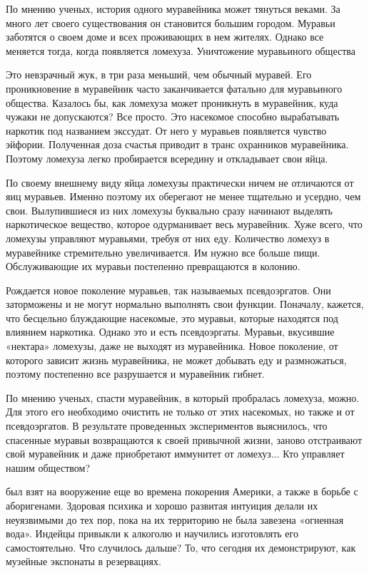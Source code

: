 \begin{itemize}
\begin{multicols}{2}
По мнению ученых, история одного муравейника может тянуться веками. За много
лет своего существования он становится большим городом. Муравьи заботятся о
своем доме и всех проживающих в нем жителях. Однако все меняется тогда, когда
появляется ломехуза.  Уничтожение муравьиного общества


Это невзрачный жук, в три раза меньший, чем обычный муравей. Его проникновение
в муравейник часто заканчивается фатально для муравьиного общества. Казалось
бы, как ломехуза может проникнуть в муравейник, куда чужаки не допускаются? Все
просто. Это насекомое способно вырабатывать наркотик под названием экссудат. От
него у муравьев появляется чувство эйфории. Полученная доза счастья приводит в
транс охранников муравейника. Поэтому ломехуза легко пробирается всередину и
откладывает свои яйца.


По своему внешнему виду яйца ломехузы практически ничем не отличаются от яиц
муравьев. Именно поэтому их оберегают не менее тщательно и усердно, чем свои.
Вылупившиеся из них ломехузы буквально сразу начинают выделять наркотическое
вещество, которое одурманивает весь муравейник. Хуже всего, что ломехузы
управляют муравьями, требуя от них еду. Количество ломехуз в муравейнике
стремительно увеличивается. Им нужно все больше пищи. Обслуживающие их муравьи
постепенно превращаются в колонию.


Рождается новое поколение муравьев, так называемых псевдоэргатов. Они
заторможены и не могут нормально выполнять свои функции. Поначалу, кажется, что
бесцельно блуждающие насекомые, это муравьи, которые находятся под влиянием
наркотика. Однако это и есть псевдоэргаты. Муравьи, вкусившие «нектара»
ломехузы, даже не выходят из муравейника. Новое поколение, от которого зависит
жизнь муравейника, не может добывать еду и размножаться, поэтому постепенно все
разрушается и муравейник гибнет.

По мнению ученых, спасти муравейник, в который пробралась ломехуза, можно. Для
этого его необходимо очистить не только от этих насекомых, но также и от
псевдоэргатов. В результате проведенных экспериментов выяснилось, что спасенные
муравьи возвращаются к своей привычной жизни, заново отстраивают свой
муравейник и даже приобретают иммунитет от ломехуз... Кто управляет нашим
обществом?

 был взят на вооружение еще во времена покорения Америки, а
также в борьбе с аборигенами. Здоровая психика и хорошо развитая интуиция
делали их неуязвимыми до тех пор, пока на их территорию не была завезена
«огненная вода». Индейцы привыкли к алкоголю и научились изготовлять его
самостоятельно. Что случилось дальше? То, что сегодня их демонстрируют, как
музейные экспонаты в резервациях.


\end{multicols}
\end{itemize}

